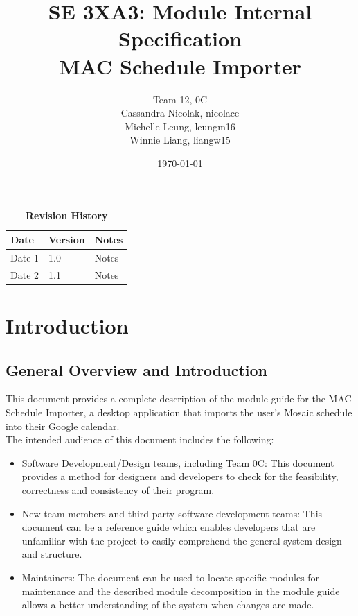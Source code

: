 \documentclass[12pt, titlepage]{article}
\title{SE 3XA3: Module Internal Specification\\MAC Schedule Importer}
\author{Team 12, 0C
		\\ Cassandra Nicolak, nicolace
		\\ Michelle Leung, leungm16
		\\ Winnie Liang, liangw15
}
\date{\today}
\begin{document}
\maketitle

\tableofcontents
\listoftables
\listoffigures

\begin{table}[bp]
\caption{\bf Revision History}
\begin{tabularx}{\textwidth}{p{3cm}p{2cm}X}
\toprule {\bf Date} & {\bf Version} & {\bf Notes}\\
\midrule
Date 1 & 1.0 & Notes\\
Date 2 & 1.1 & Notes\\
\bottomrule
\end{tabularx}
\end{table}

\newpage


\section{Introduction}
\subsection{General Overview and Introduction}
This document provides a complete description of the module guide for the MAC Schedule Importer, a desktop application that imports the user's Mosaic schedule into their Google calendar.\\

The intended audience of this document includes the following: 

\begin{itemize}
\item Software Development/Design teams, including Team 0C: This document provides a method for designers and developers to
  check for the feasibility, correctness and consistency of their program. 
\item New team members and third party software development teams: This document can be a reference guide which enables developers that are unfamiliar with the project to easily comprehend the general system design and structure. 
\item Maintainers: The document can be used to locate specific modules for maintenance and the described module decomposition in the module guide allows a better understanding of the system when changes are made. %
\end{itemize}
\end{document}
